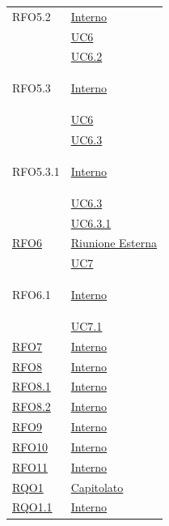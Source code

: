 \begin{itemize}
\begin{itemize}
\begin{itemize}
\begin{itemize}
\begin{longtable}{|>{\centering}m{5cm}|m{5cm}<{\centering}|}
\hypertarget{RFO5.2}{RFO5.2} &  \hyperlink{Interno}{Interno}\\
& \hyperref[UC6]{UC6}\\
& \hyperref[UC6.2]{UC6.2}\\ \hline

\hypertarget{RFO5.3}{RFO5.3} &  \hyperlink{Interno}{Interno}\\
& \hyperref[UC6]{UC6}\\
& \hyperref[UC6.3]{UC6.3}\\ \hline

\hypertarget{RFO5.3.1}{RFO5.3.1} &  \hyperlink{Interno}{Interno}\\
& \hyperref[UC6.3]{UC6.3}\\
& \hyperref[UC6.3.1]{UC6.3.1}\\ \hline

\hyperlink{RFO6}{RFO6} & \hyperlink{Riunione Esterna}{Riunione Esterna}\\
& \hyperref[UC7]{UC7}\\ \hline

\hypertarget{RFO6.1}{RFO6.1} & \hyperlink{Interno}{Interno}\\
& \hyperref[UC7.1]{UC7.1}\\ \hline

\hyperlink{RFO7}{RFO7} & \hyperlink{Interno}{Interno}\\\hline

\hyperlink{RFO8}{RFO8} & \hyperlink{Interno}{Interno}\\\hline

\hyperlink{RFO8.1}{RFO8.1} & \hyperlink{Interno}{Interno}\\\hline

\hyperlink{RFO8.2}{RFO8.2} & \hyperlink{Interno}{Interno}\\\hline

\hyperlink{RFO9}{RFO9} & \hyperlink{Interno}{Interno}\\\hline

\hyperlink{RFO10}{RFO10} & \hyperlink{Interno}{Interno}\\\hline

\hyperlink{RFO11}{RFO11} & \hyperlink{Interno}{Interno}\\\hline

\hyperlink{RQO1}{RQO1} & \hyperlink{Capitolato}{Capitolato}\\ \hline

\hyperlink{RQO1.1}{RQO1.1} & \hyperlink{Interno}{Interno}\\ \hline


\end{longtable}
\end{itemize}
\end{itemize}
\end{itemize}
\end{itemize}
